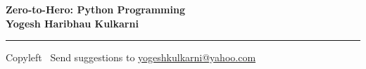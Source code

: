 
\graphicspath{{images/}}

\footnotesize


\begin{center}
\Large{\textbf{Zero-to-Hero: Python Programming\\ Yogesh Haribhau Kulkarni}}  
\end{center}

\begin{multicols}{2}
	
\end{multicols}

\rule{\linewidth}{0.25pt}
\scriptsize
Copyleft \textcopyleft\  Send suggestions to 
\href{http://www.yogeshkulkarni.com}{yogeshkulkarni@yahoo.com}



